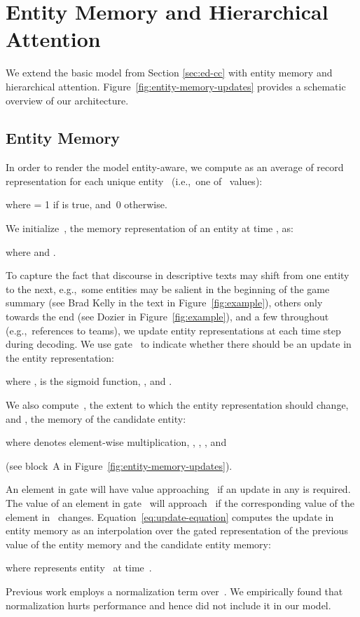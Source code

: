 \documentclass[11pt,a4paper]{article}
\begin{document}
\section{Entity Memory and Hierarchical Attention}
\label{sec:entity-memory}
We extend the basic model from Section \ref{sec:ed-cc} with entity
memory and hierarchical
attention. Figure~\ref{fig:entity-memory-updates} provides a schematic
overview of our architecture.

\subsection{Entity Memory}
In order to render the model entity-aware, we compute  as an average of record representation for each 
unique entity~ (i.e.,~one of~ values):

where  = 1 if  is true, and~0 otherwise.

We initialize~, the memory representation of
an entity at time , as:

where  and
.

To capture the fact that discourse in descriptive texts may shift from
one entity to the next, e.g.,~some entities may be salient in the
beginning of the game summary (see Brad Kelly in the text in
Figure~\ref{fig:example}), others only towards the end (see Dozier in
Figure~\ref{fig:example}), and a few throughout (e.g.,~references to
teams), we update entity representations at each time step during
decoding.  We use gate~ to indicate whether
there should be an update in the entity representation:

where ,  is the sigmoid function,
, and
.

We also  compute~,  the extent to
which the entity representation should change, and
 , the memory of the candidate entity:

where  denotes element-wise multiplication,
,
,
, and

(see block~A in
Figure~\ref{fig:entity-memory-updates}).  

An element in gate  will have value
approaching~ if an update in any  is required.
The value of an element in gate~ will
approach~ if the corresponding value of the element
in~ changes. Equation~\eqref{eq:update-equation}
computes the update in entity memory as an interpolation over the
gated representation of the previous value of the entity memory and
the candidate entity memory:

where  represents entity~ at time~.

Previous work \cite{DBLP:conf/iclr/HenaffWSBL17,D17-1195,N18-1204} employs a
normalization term over~. We empirically found that
normalization hurts performance and hence did not include it in our
model.
\end{document}
